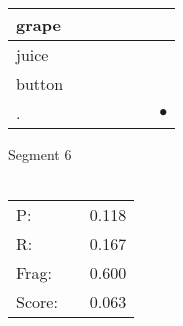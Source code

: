 \documentclass[landscape]{article}
\newcommand{\ssp}{\hspace{2pt}}
\newcommand{\mex}{\cellcolor{g}$\bullet$}
\begin{document}
\begin{tabular}{|l|p{10pt}|p{10pt}|p{10pt}|p{10pt}|p{10pt}|p{10pt}|}
\hline
\ssp grape \ssp&\hspace{2pt}&\hspace{2pt}&\hspace{2pt}&\hspace{2pt}&\hspace{2pt}&\hspace{2pt}\\
\hline
\ssp juice \ssp&\hspace{2pt}&\hspace{2pt}&\hspace{2pt}&\hspace{2pt}&\hspace{2pt}&\hspace{2pt}\\
\hline
\ssp button \ssp&\hspace{2pt}&\hspace{2pt}&\hspace{2pt}&\hspace{2pt}&\hspace{2pt}&\hspace{2pt}\\
\hline
\ssp \cellcolor{ref5}. \ssp&\hspace{2pt}&\hspace{2pt}&\hspace{2pt}&\hspace{2pt}&\hspace{2pt}&\hspace{2pt}\mex\\
\hline
\end{tabular}

\vspace{6pt}
\noindent Segment 6\\\\
\noindent\begin{tabular}{lm{12pt}r}
\hline
P:&&0.118\\
R:&&0.167\\
Frag:&&0.600\\
Score:&&0.063\\
\end{tabular}

\newpage
\end{document}
